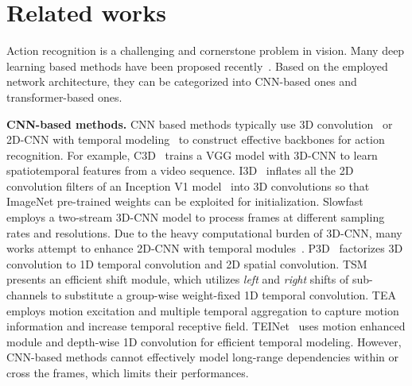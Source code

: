 \documentclass[runningheads]{llncs}
\begin{document}
	
	\section{Related works}
	
	Action recognition is a challenging and cornerstone problem in vision. Many deep learning based methods have been proposed recently~\cite{LSF3Diccv2015,CTNFcvpr2016,TCNnips2014,rohrbach2016recognizing,LSF3Diccv2015,yang2020temporal,piergiovanni2019representation,christoph2016spatiotemporal,martinez2019action,zheng2020dynamic,zhao2018recognize,li2020tea,feichtenhofer2019slowfast,wang2016temporal,TSN2016ECCV,carreira2017quo,qiu2017learning,lin2019tsm}. Based on the employed network architecture, they can be categorized into CNN-based ones and transformer-based ones. 
	
	\textbf{CNN-based methods.} CNN based methods typically use 3D convolution~\cite{LSF3Diccv2015,carreira2017quo,feichtenhofer2019slowfast} or 2D-CNN with temporal modeling~\cite{TSN2016ECCV,qiu2017learning,lin2019tsm} to construct effective backbones for action recognition. For example, C3D~\cite{LSF3Diccv2015} trains a VGG model with 3D-CNN to learn spatiotemporal features from a video sequence. I3D~\cite{carreira2017quo} inflates all the 2D convolution filters of an Inception V1 model~\cite{inceptionv1} into 3D convolutions so that ImageNet pre-trained weights can be exploited for initialization. Slowfast~\cite{feichtenhofer2019slowfast} employs a two-stream 3D-CNN model to process frames at different sampling rates and resolutions. Due to the heavy computational burden of 3D-CNN, many works attempt to enhance 2D-CNN with temporal modules~\cite{TSN2016ECCV,qiu2017learning,lin2019tsm,liu2020teinet,li2020tea,wang2021tdn}. P3D~\cite{qiu2017learning} factorizes 3D convolution to 1D temporal convolution and 2D spatial convolution. TSM~\cite{lin2019tsm} presents an efficient shift module, which utilizes \textit{left} and \textit{right} shifts of sub-channels to substitute a group-wise weight-fixed 1D temporal convolution. TEA~\cite{li2020tea} employs motion excitation and multiple temporal aggregation to capture motion information and increase temporal receptive field. TEINet~\cite{liu2020teinet} uses motion enhanced module and depth-wise 1D convolution for efficient temporal modeling. However, CNN-based methods cannot effectively model long-range dependencies within or cross the frames, which limits their performances. 
	
\end{document}
